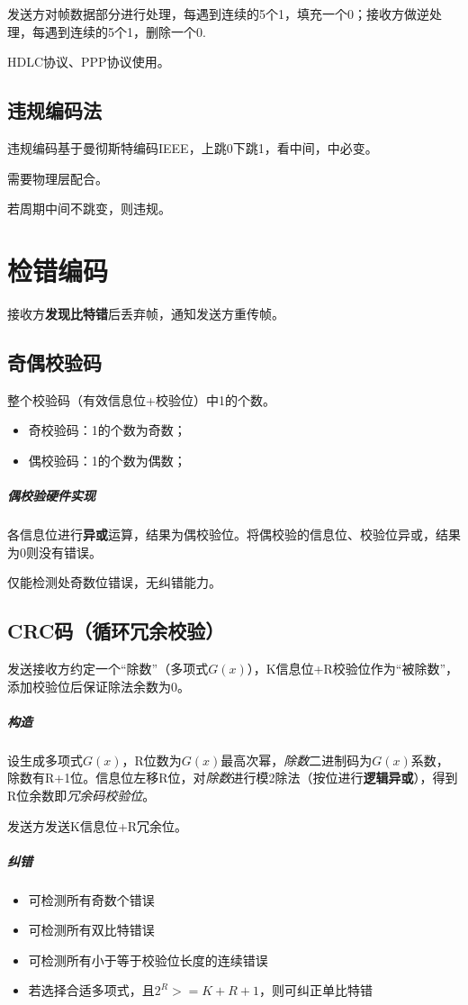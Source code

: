 发送方对帧数据部分进行处理，每遇到连续的5个1，填充一个0；接收方做逆处理，每遇到连续的5个1，删除一个0.

HDLC协议、PPP协议使用。


\subsection{违规编码法}
违规编码基于曼彻斯特编码IEEE，上跳0下跳1，看中间，中必变。

需要物理层配合。

若周期中间不跳变，则违规。


\section{检错编码}\label{检错编码}
接收方\textbf{发现比特错}后丢弃帧，通知发送方重传帧。

\subsection{奇偶校验码}
整个校验码（有效信息位+校验位）中1的个数。
\begin{itemize}
    \item 奇校验码：1的个数为奇数；
    \item 偶校验码：1的个数为偶数；
\end{itemize}
\subparagraph{偶校验硬件实现}
各信息位进行\textbf{异或}运算，结果为偶校验位。将偶校验的信息位、校验位异或，结果为0则没有错误。

仅能检测处奇数位错误，无纠错能力。


\subsection{CRC码（循环冗余校验）}
发送接收方约定一个“除数”（多项式\(G(x)\)），K信息位+R校验位作为“被除数”，添加校验位后保证除法余数为0。

\subparagraph{构造}
设生成多项式\(G(x)\)，R位数为\(G(x)\)最高次幂，\textit{除数}二进制码为\(G(x)\)系数，除数有R+1位。信息位左移R位，对\textit{除数}进行模2除法（按位进行\textbf{逻辑异或}），得到R位余数即\textit{冗余码校验位}。

发送方发送K信息位+R冗余位。


\subparagraph{纠错}
\begin{itemize}
    \item 可检测所有奇数个错误
    \item 可检测所有双比特错误
    \item 可检测所有小于等于校验位长度的连续错误
    \item 若选择合适多项式，且\(2^R >= K + R + 1\)，则可纠正单比特错
\end{itemize}


